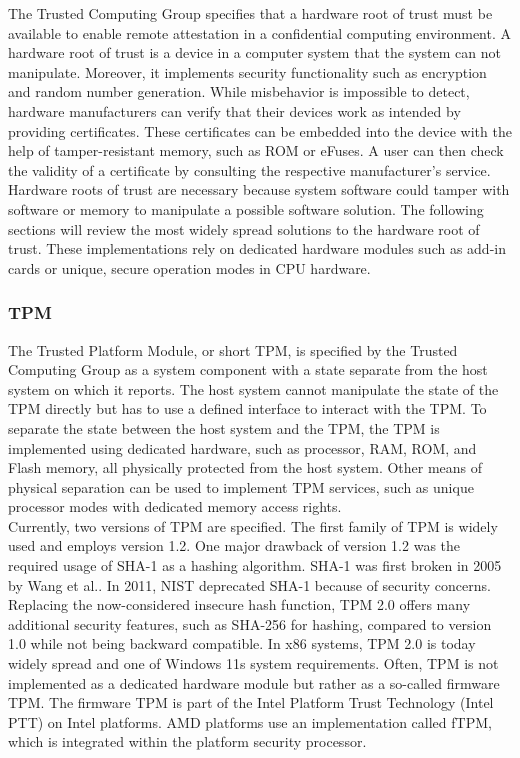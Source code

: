 The Trusted Computing Group specifies that a hardware root of trust must be
available to enable remote attestation in a confidential computing
environment.\cite{tpm_architecture} A hardware root of trust is a device in a
computer system that the system can not manipulate. Moreover, it implements
security functionality such as encryption and random number generation. While
misbehavior is impossible to detect, hardware manufacturers can verify that
their devices work as intended by providing certificates. These certificates can
be embedded into the device with the help of tamper-resistant memory, such as
ROM or eFuses. A user can then check the validity of a certificate by consulting
the respective manufacturer's service. \\

Hardware roots of trust are necessary because system software could tamper with
software or memory to manipulate a possible software solution. The following
sections will review the most widely spread solutions to the hardware root of
trust. These implementations rely on dedicated hardware modules such as add-in
cards or unique, secure operation modes in CPU hardware. \\

\subsubsection{TPM}
\label{sec:20:tpm}
The Trusted Platform Module, or short TPM, is specified by the Trusted Computing
Group as a system component with a state separate from the host system on which
it reports.\cite{tpm_architecture} The host system cannot manipulate the state
of the TPM directly but has to use a defined interface to interact with the TPM.
To separate the state between the host system and the TPM, the TPM is
implemented using dedicated hardware, such as processor, RAM, ROM, and Flash
memory, all physically protected from the host system. Other means of physical
separation can be used to implement TPM services, such as unique processor modes
with dedicated memory access rights. \\

Currently, two versions of TPM are specified. The first family of TPM is widely
used and employs version 1.2. One major drawback of version 1.2 was the required
usage of SHA-1 as a hashing algorithm. SHA-1 was first broken in 2005 by Wang et
al.\cite{wang2005collision}. In 2011, NIST deprecated SHA-1 because of security
concerns. Replacing the now-considered insecure hash function, TPM 2.0 offers
many additional security features, such as SHA-256 for hashing, compared to
version 1.0 while not being backward compatible. In x86 systems, TPM 2.0 is
today widely spread and one of Windows 11s system requirements. Often, TPM is
not implemented as a dedicated hardware module but rather as a so-called
firmware TPM. The firmware TPM is part of the Intel Platform Trust Technology
(Intel PTT) on Intel platforms. AMD platforms use an implementation called fTPM,
which is integrated within the platform security
processor.\cite{pirker2024brief} \\

